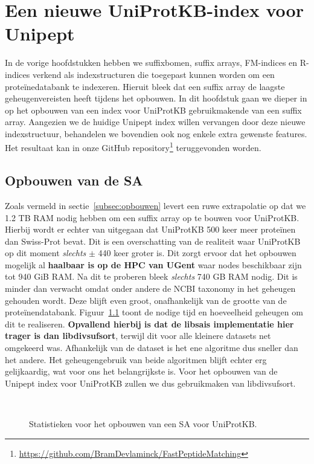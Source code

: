 \chapter{Een nieuwe UniProtKB-index voor Unipept}\label{ch:een-nieuwe-uniprotkb-index-voor-unipept}
In de vorige hoofdstukken hebben we suffixbomen, suffix arrays, FM-indices en R-indices verkend als indexstructuren die toegepast kunnen worden om een proteïnedatabank te indexeren.
Hieruit bleek dat een suffix array de laagste geheugenvereisten heeft tijdens het opbouwen.
In dit hoofdstuk gaan we dieper in op het opbouwen van een index voor UniProtKB gebruikmakende van een suffix array.
Aangezien we de huidige Unipept index willen vervangen door deze nieuwe indexstructuur, behandelen we bovendien ook nog enkele extra gewenste features.
Het resultaat kan in onze GitHub repository\footnote{\url{https://github.com/BramDevlaminck/FastPeptideMatching}} teruggevonden worden.

\section{Opbouwen van de SA}\label{sec:opbouwen-van-de-sa}
Zoals vermeld in sectie~\ref{subsec:opbouwen} levert een ruwe extrapolatie op dat we 1.2 TB RAM nodig hebben om een suffix array op te bouwen voor UniProtKB\@.
Hierbij wordt er echter van uitgegaan dat UniProtKB 500 keer meer proteïnen dan Swiss-Prot bevat.
Dit is een overschatting van de realiteit waar UniProtKB op dit moment \textit{slechts} $\pm$ 440 keer groter is.
Dit zorgt ervoor dat het opbouwen mogelijk al \textbf{haalbaar is op de HPC van UGent} waar nodes beschikbaar zijn tot 940 GiB RAM\@.
Na dit te proberen bleek \textit{slechts} 740 GB RAM nodig.
Dit is minder dan verwacht omdat onder andere de NCBI taxonomy in het geheugen gehouden wordt.
Deze blijft even groot, onafhankelijk van de grootte van de proteïnendatabank.
Figuur~\ref{fig:build_uniprot} toont de nodige tijd en hoeveelheid geheugen om dit te realiseren.
\textbf{Opvallend hierbij is dat de libsais implementatie hier trager is dan libdivsufsort}, terwijl dit voor alle kleinere datasets net omgekeerd was.
Afhankelijk van de dataset is het ene algoritme dus sneller dan het andere.
Het geheugengebruik van beide algoritmen blijft echter erg gelijkaardig, wat voor ons het belangrijkste is.
Voor het opbouwen van de Unipept index voor UniProtKB zullen we dus gebruikmaken van libdivsufsort.
\\
\begin{figure}[H]
    \centering
    \\[4ex] %

    \caption{Statistieken voor het opbouwen van een SA voor UniProtKB.}\label{fig:build_uniprot}
\end{figure}
\newpage
